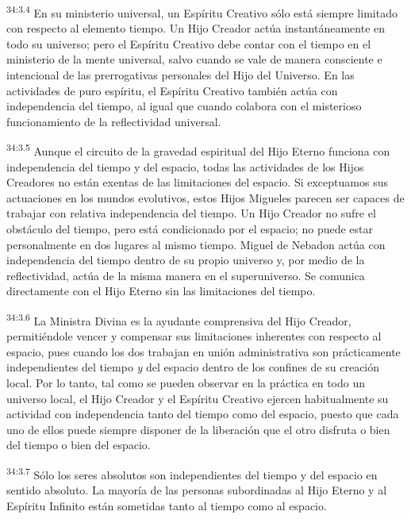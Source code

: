 \par
\textsuperscript{34:3.4} En su ministerio universal, un Espíritu Creativo sólo está siempre limitado con respecto al elemento tiempo. Un Hijo Creador actúa instantáneamente en todo su universo; pero el Espíritu Creativo debe contar con el tiempo en el ministerio de la mente universal, salvo cuando se vale de manera consciente e intencional de las prerrogativas personales del Hijo del Universo. En las actividades de puro espíritu, el Espíritu Creativo también actúa con independencia del tiempo, al igual que cuando colabora con el misterioso funcionamiento de la reflectividad universal.

\par
\textsuperscript{34:3.5} Aunque el circuito de la gravedad espiritual del Hijo Eterno funciona con independencia del tiempo y del espacio, todas las actividades de los Hijos Creadores no están exentas de las limitaciones del espacio. Si exceptuamos sus actuaciones en los mundos evolutivos, estos Hijos Migueles parecen ser capaces de trabajar con relativa independencia del tiempo. Un Hijo Creador no sufre el obstáculo del tiempo, pero está condicionado por el espacio; no puede estar personalmente en dos lugares al mismo tiempo. Miguel de Nebadon actúa con independencia del tiempo dentro de su propio universo y, por medio de la reflectividad, actúa de la misma manera en el superuniverso. Se comunica directamente con el Hijo Eterno sin las limitaciones del tiempo.

\par
\textsuperscript{34:3.6} La Ministra Divina es la ayudante comprensiva del Hijo Creador, permitiéndole vencer y compensar sus limitaciones inherentes con respecto al espacio, pues cuando los dos trabajan en unión administrativa son prácticamente independientes del tiempo \textit{y} del espacio dentro de los confines de su creación local. Por lo tanto, tal como se pueden observar en la práctica en todo un universo local, el Hijo Creador y el Espíritu Creativo ejercen habitualmente su actividad con independencia tanto del tiempo como del espacio, puesto que cada uno de ellos puede siempre disponer de la liberación que el otro disfruta o bien del tiempo o bien del espacio.

\par
\textsuperscript{34:3.7} Sólo los seres absolutos son independientes del tiempo y del espacio en sentido absoluto. La mayoría de las personas subordinadas al Hijo Eterno y al Espíritu Infinito están sometidas tanto al tiempo como al espacio.

